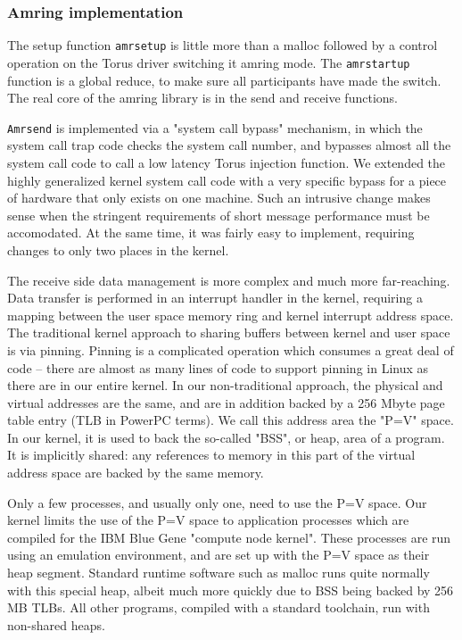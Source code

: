 \documentclass[letterpaper,twocolumn,10pt]{article}
\begin{document}
\subsubsection{Amring implementation}
The setup function {\tt amrsetup} is little more than a malloc followed by a 
control operation on the Torus driver switching it amring mode. The {\tt amrstartup} 
function is a global reduce, to make sure all participants have made the switch. The real 
core of the amring library is in the send and receive functions. 

{\tt Amrsend} is implemented via a "system call bypass" mechanism, in which the system call trap code
checks the system call number, and bypasses almost all the system call code to call a low latency 
Torus injection function. We
extended the highly generalized kernel system call code with a very specific bypass for a piece of hardware that only exists on 
one machine. Such an intrusive change makes sense when the stringent requirements of short message 
performance must be accomodated. At the same time, it was fairly easy to implement, requiring changes to only two places in the kernel. 

The receive side data management is more complex and much more far-reaching. Data transfer is performed in an interrupt 
handler in the kernel, requiring a mapping between the user space memory ring and kernel interrupt address space. 
The traditional kernel approach to sharing buffers between kernel and user space is via pinning. Pinning is a complicated 
operation which consumes a great deal of code -- there are almost as many lines of code to support 
pinning in Linux as there are in our entire kernel. 
In our  non-traditional approach, the physical and virtual addresses are the same, and are in addition backed by a 
256 Mbyte page table entry (TLB in PowerPC terms). 
We call this address area the "P=V" space. In our kernel, it is used to back the so-called "BSS", or heap, area of a program. It is implicitly
shared: any references to memory in this part of the virtual address space are backed by the same memory. 

Only a few processes, and usually only one, need to use the P=V space. 
Our kernel limits the use of the P=V space to application processes which are compiled for the
IBM Blue Gene "compute node kernel". These
processes are run using an emulation environment\cite{plan9bgp}, and are set up with the P=V 
space as their heap segment. Standard runtime software such as malloc runs quite normally with this 
special heap, albeit much more quickly due to BSS being backed by 256 MB TLBs. All other programs,
compiled with a standard toolchain, run with non-shared heaps.
\end{document}
